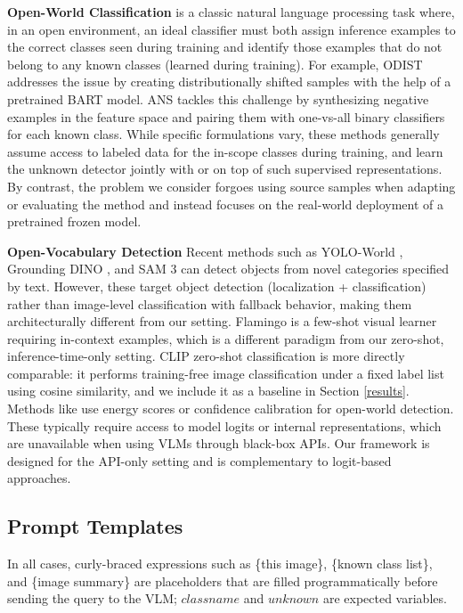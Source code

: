 \documentclass[10pt]{article} %
\begin{document}
\textbf{Open-World Classification} is a classic natural language processing task \cite{fei-liu-2016-breaking} where, in an open environment, an ideal classifier must both assign inference examples to the correct classes seen during training and identify those examples that do not belong to any known classes (learned during training).
For example, ODIST \cite{Shu2021} addresses the issue by creating distributionally shifted samples with the help of a pretrained BART model. 
ANS \cite{bai2022open} tackles this challenge by synthesizing negative examples in the feature space and pairing them with one-vs-all binary classifiers for each known class.
While specific formulations vary, these methods generally assume access to labeled data for the in-scope classes during training, and learn the unknown detector jointly with or on top of such supervised representations.
By contrast, the problem we consider forgoes using source samples when adapting or evaluating the method and instead focuses on the real-world deployment of a pretrained frozen model.

\textbf{Open-Vocabulary Detection}
Recent methods such as YOLO-World \cite{cheng2024yolo}, Grounding DINO \cite{liu2024grounding}, and SAM 3 \cite{carion2025sam} can detect objects from novel categories specified by text. However, these target object detection (localization + classification) rather than image-level classification with fallback behavior, making them architecturally different from our setting. Flamingo \cite{alayrac2022flamingo} is a few-shot visual learner requiring in-context examples, which is a different paradigm from our zero-shot, inference-time-only setting. CLIP \cite{miller2024open, radford2021learning} zero-shot classification is more directly comparable: it performs training-free image classification under a fixed label list using cosine similarity, and we include it as a baseline in Section \ref{results}. Methods like \cite{joseph2021towards} use energy scores or confidence calibration for open-world detection. These typically require access to model logits or internal representations, which are unavailable when using VLMs through black-box APIs. Our framework is designed for the API-only setting and is complementary to logit-based approaches.

\subsection{Prompt Templates} \label{apx: prompt templates}
In all cases, curly-braced expressions such as \{this image\}, \{known class list\}, and \{image summary\} are placeholders that are filled programmatically before sending the query to the VLM; $classname$ and $unknown$ are expected variables.
\end{document}
